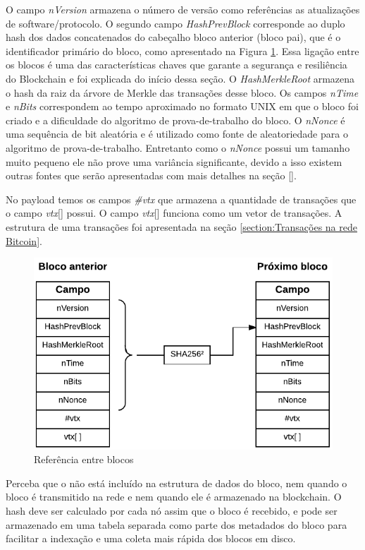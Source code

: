 \documentclass[conference,compsoc]{IEEEtran}
\begin{document}
O campo \textit{nVersion} armazena o número de versão como referências as atualizações de software/protocolo. O segundo campo \textit{HashPrevBlock} corresponde ao duplo hash dos dados concatenados do cabeçalho bloco anterior (bloco pai), que é o identificador primário do bloco, como apresentado na Figura \ref{fig:Ref_blocos}. Essa ligação entre os blocos é uma das características chaves que garante a segurança e resiliência do Blockchain e foi explicada do início dessa seção. O \textit{HashMerkleRoot} armazena o hash da raiz da árvore de Merkle das transações desse bloco. Os campos \textit{nTime} e \textit{nBits} correspondem ao tempo aproximado no formato UNIX em que o bloco foi criado e a dificuldade do algoritmo de prova-de-trabalho do bloco. O \textit{nNonce} é uma sequência de bit aleatória e é utilizado como fonte de aleatoriedade para o algoritmo de prova-de-trabalho. Entretanto como o \textit{nNonce} possui um tamanho muito pequeno ele não prove uma variância significante, devido a isso existem outras fontes que serão apresentadas com mais detalhes na seção \ref{}.

No payload temos os campos \textit{\#vtx} que armazena a quantidade de transações que o campo \textit{vtx}[] possui. O campo \textit{vtx}[] funciona como um vetor de transações. A estrutura de uma transações foi apresentada na seção \ref{section:Transações na rede Bitcoin}.

\begin{figure}[H]
    \centering
    \includegraphics[keepaspectratio=true, scale=0.6]{img/Referencia_entre_blocos.pdf}
    \caption{Referência entre blocos}
    \label{fig:Ref_blocos}
\end{figure}

Perceba que o não está incluído na estrutura de dados do bloco, nem quando o bloco é transmitido na rede e nem quando ele é armazenado na blockchain. O hash deve ser calculado por cada nó assim que o bloco é recebido, e pode ser armazenado em uma tabela separada como parte dos metadados do bloco para facilitar a indexação e uma coleta mais rápida dos blocos em disco. 
\end{document}
